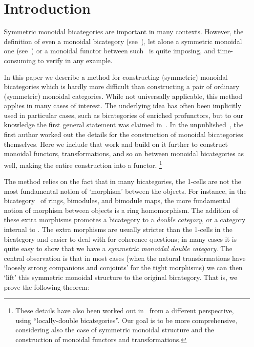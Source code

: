 \section{Introduction}
\label{sec:introduction}

Symmetric monoidal bicategories are important in many contexts.
However, the definition of even a monoidal bicategory
(see~\cite{gps:tricats,nick:tricats}), let alone a symmetric monoidal
one
(see~\cite{kv:2cat-zam,kv:bm2cat,bn:hda-i,ds:monbi-hopfagbd,crans:centers,mccrudden:bal-coalgb,gurski:brmonbicat}) 
or a monoidal functor between such~\cite{nick:tricatsbook,mccrudden:bal-coalgb}
is quite imposing, and time-consuming to verify in any example.

In this paper we describe a method for constructing (symmetric) monoidal
bicategories which is hardly more difficult than constructing a pair
of ordinary (symmetric) monoidal categories.
While not universally applicable, this method applies in many cases of interest.
The underlying idea has often been implicitly used in particular cases, such as
bicategories of enriched profunctors, but to our knowledge the first
general statement was claimed in~\cite[Appendix B]{shulman:frbi}.
In the unpublished~\cite{shulman:smbicat}, the first author worked out the details for the construction of monoidal bicategories themselves.
Here we include that work and build on it further to construct monoidal functors, transformations, and so on between monoidal bicategories as well, making the entire construction into a functor.
\footnote{These details have also been worked out
in~\cite[\S5]{gg:ldstr-tricat} from a different perspective, using
``locally-double bicategories''.  Our goal is to be more
comprehensive, considering also the case of symmetric monoidal
structure and the construction of monoidal functors and
transformations.}

The method relies on the fact that in many bicategories, the 1-cells
are not the most fundamental notion of `morphism' between the objects.
For instance, in the bicategory \cMod\ of rings, bimodules, and
bimodule maps, the more fundamental notion of morphism between objects
is a ring homomorphism. The addition of these extra morphisms promotes
a bicategory to a \emph{double category}, or a category internal to
\cCat.  The extra morphisms are usually stricter than the 1-cells in
the bicategory and easier to deal with for coherence questions; in
many cases it is quite easy to show that we have a \emph{symmetric
  monoidal double category}.  The central observation is that in most
cases (when the natural transformations have `loosely strong companions and conjoints' for the tight morphisms) we can then `lift' this
symmetric monoidal structure to the original bicategory.  That is, we
prove the following theorem:

